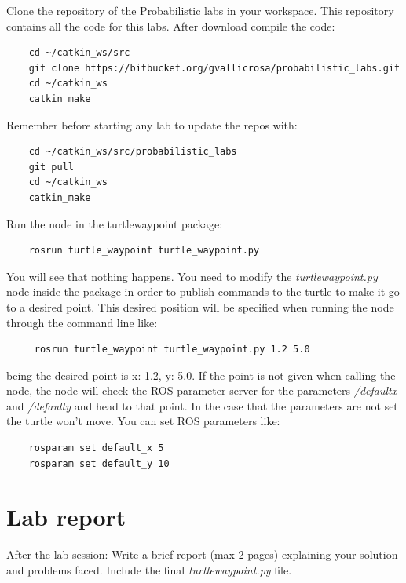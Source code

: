 \documentclass[a4paper,10pt]{article}
\begin{document}
\noindent
Clone the repository of the Probabilistic labs in your workspace. This repository contains all the code for this labs. After download compile the code:
\begin{verbatim}
    cd ~/catkin_ws/src
    git clone https://bitbucket.org/gvallicrosa/probabilistic_labs.git
    cd ~/catkin_ws
    catkin_make
\end{verbatim}
\noindent Remember before starting any lab to update the repos with:
\begin{verbatim}
    cd ~/catkin_ws/src/probabilistic_labs
    git pull
    cd ~/catkin_ws
    catkin_make
\end{verbatim}
\noindent
Run the node in the turtle{\textunderscore}waypoint package: 
\begin{verbatim}
    rosrun turtle_waypoint turtle_waypoint.py
\end{verbatim}
You will see that nothing happens. You need to modify the \emph{turtle{\textunderscore}waypoint.py} node inside the package in order to publish commands to the turtle to make it go to a desired point. This desired position will be specified when running the node through the command line like:
\begin{verbatim}
 	 rosrun turtle_waypoint turtle_waypoint.py 1.2 5.0
\end{verbatim}
being the desired point is x: 1.2, y: 5.0. If the point is not given when calling the node, the node will check the ROS parameter server for the parameters \emph{/default{\textunderscore}x} and \emph{/default{\textunderscore}y} and head to that point. In the case that the parameters are not set the turtle won't move. You can set ROS parameters like:
\begin{verbatim}
    rosparam set default_x 5
    rosparam set default_y 10
\end{verbatim}

\section{Lab report}

After the lab session: Write a brief report (max 2 pages) explaining your solution and problems faced. Include the final \emph{turtle{\textunderscore}waypoint.py} file.
\end{document}
